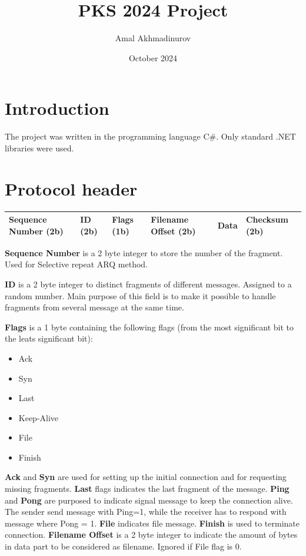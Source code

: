 \documentclass{article}
\title{PKS 2024 Project}
\author{Amal Akhmadinurov}
\date{October 2024}
\begin{document}
\maketitle
\tableofcontents
\newpage
\section{Introduction}
The project was written in the programming language C\#. Only standard .NET libraries were used.


\section{Protocol header}


\begin{tabular}{|p{2cm}|p{1cm}|p{1cm}|p{2cm}|p{4cm}|p{2cm}|}
\hline
Sequence Number (2b) & 
ID (2b) & 
Flags  (1b)& 
Filename Offset (2b) &
Data  &
Checksum (2b)

\\
\hline




\end{tabular}
\newline
\newline

\textbf{Sequence Number} is a 2 byte integer to store the number of the fragment. Used for Selective repeat ARQ method.
\newline

\textbf{ID}  is a 2 byte integer to distinct fragments of different messages. Assigned to a random number. Main purpose of this field is to make it possible to handle fragments from several message at the same time.
\newline

\textbf{Flags}  is a 1 byte containing the following flags (from the most significant bit to the leats significant bit):
\begin{itemize}
  \item Ack  
  \item Syn
  \item Last
  \item Keep-Alive
  \item File  
  \item Finish

 
\end{itemize}
\textbf{Ack} and \textbf{Syn} are used for setting up the initial connection and for requesting missing fragments.
\newline
\textbf{Last} flags indicates the last fragment of the message.
\newline
\textbf{Ping} and \textbf{Pong} are purposed to indicate signal message to keep the connection alive. The sender send message with Ping=1, while the receiver has to respond with message where Pong = 1.
\textbf{File} indicates file message.
\newline
\textbf{Finish} is used to terminate connection.
\newline
\textbf{Filename Offset}  is a 2 byte integer to indicate the amount of bytes in data part to be considered as filename. Ignored if File flag is 0.
\newline
\end{document}
